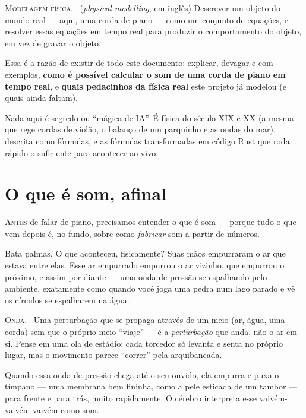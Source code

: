 \documentclass[11pt,oneside]{book}
\newcommand{\nova}[1]{\textsc{\color{accent}#1.}~}
\newcommand{\opening}[2]{\lettrine[lines=2,loversize=0.08,lraise=0.02]{#1}{#2}}
\begin{document}
\begin{newword}
\nova{Modelagem física} (\emph{physical modelling}, em inglês) Descrever um
objeto do mundo real --- aqui, uma corda de piano --- como um conjunto de
equações, e resolver essas equações em tempo real para produzir o
comportamento do objeto, em vez de gravar o objeto.
\end{newword}

Essa é a razão de existir de todo este documento: explicar, devagar e com
exemplos, \textbf{como é possível calcular o som de uma corda de piano em
tempo real}, e \textbf{quais pedacinhos da física real} este projeto já
modelou (e quais ainda faltam).

Nada aqui é segredo ou \enquote{mágica de IA}. É física do século XIX e XX
(a mesma que rege cordas de violão, o balanço de um parquinho e as ondas do
mar), descrita como fórmulas, e as fórmulas transformadas em código Rust que
roda rápido o suficiente para acontecer ao vivo.

\chapter{O que é som, afinal}

\opening{A}{ntes} de falar de piano, precisamos entender o que é som ---
porque tudo o que vem depois é, no fundo, sobre como \emph{fabricar} som a
partir de números.

Bata palmas. O que aconteceu, fisicamente? Suas mãos empurraram o ar que
estava entre elas. Esse ar empurrado empurrou o ar vizinho, que empurrou o
próximo, e assim por diante --- uma onda de pressão se espalhando pelo
ambiente, exatamente como quando você joga uma pedra num lago parado e vê os
círculos se espalharem na água.

\begin{newword}
\nova{Onda} Uma perturbação que se propaga através de um meio (ar, água,
uma corda) sem que o próprio meio \enquote{viaje} --- é a \emph{perturbação}
que anda, não o ar em si. Pense em uma ola de estádio: cada torcedor só
levanta e senta no próprio lugar, mas o movimento parece \enquote{correr}
pela arquibancada.
\end{newword}

Quando essa onda de pressão chega até o seu ouvido, ela empurra e puxa o
tímpano --- uma membrana bem fininha, como a pele esticada de um tambor ---
para frente e para trás, muito rapidamente. O cérebro interpreta esse
vaivém-vaivém-vaivém como som.
\end{document}
